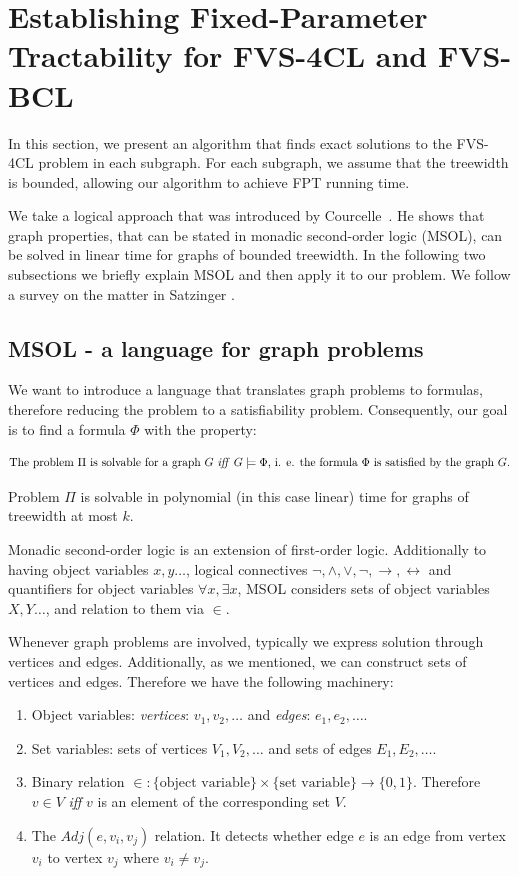 \section{Establishing Fixed-Parameter Tractability for FVS-4CL and FVS-BCL}
\label{section:exact-alg}

In this section, we present an algorithm that finds exact solutions to the FVS-4CL problem in each subgraph. 
For each subgraph, we assume that the treewidth is bounded, allowing our algorithm to achieve FPT running time.

We take a logical approach that was introduced by Courcelle~\cite{courcelle1990monadic}. 
He shows that graph properties, that can be stated in monadic second-order logic (MSOL), can be solved in 
linear time for graphs of bounded treewidth. In the following two subsections we briefly explain MSOL and 
then apply it to our problem. We follow a survey on the matter in Satzinger \cite{satzinger2014tree}. 

\subsection{MSOL - a language for graph problems}

 We want to introduce a language that translates graph problems to formulas, therefore reducing 
the problem to a satisfiability problem. Consequently, our goal is to find a formula $\Phi$ with the 
property: 

\[\text{The problem $\Pi$ is solvable for a graph $G$ \textit{iff} $G \models \Phi$, i. e. the formula 
$\Phi$ is satisfied by the graph $G$.}\]

Problem $\Pi$ is solvable in polynomial (in this case linear) time for graphs of treewidth at 
most $k$.

Monadic second-order logic is an extension of first-order logic. Additionally to having 
object variables $x, y \dots$, logical connectives $\lnot, \land, \lor, \lnot,
\rightarrow, \longleftrightarrow$ and quantifiers for object variables $\forall x, 
\exists x$, MSOL considers sets of object variables $X, Y \dots$, and relation to them 
via $\in$.

Whenever graph problems are involved, typically we express solution through 
vertices and edges. Additionally, as we mentioned, we can construct sets of vertices 
and edges. Therefore we have the following machinery:

\begin{enumerate}[label=\textbf{•}]
    \item Object variables: \textit{vertices}: $v_1, v_2, \dots$ and \textit{edges}: $e_1, e_2, \dots$. 
    \item Set variables: sets of vertices $V_1, V_2, \dots$ and sets of edges $E_1, E_2, \dots$.
    \item Binary relation $\in : \{\text{object variable}\} \times \{\text{set variable}\} \to \{0, 1\}$. Therefore 
    $v \in V$ \textit{iff} $v$ is an element of the corresponding set $V$.
    \item The $Adj(e, v_i, v_j)$ relation. It detects whether edge $e$ is an edge from vertex $v_i$ to 
    vertex $v_j$ where $v_i \neq v_j$.
\end{enumerate}

